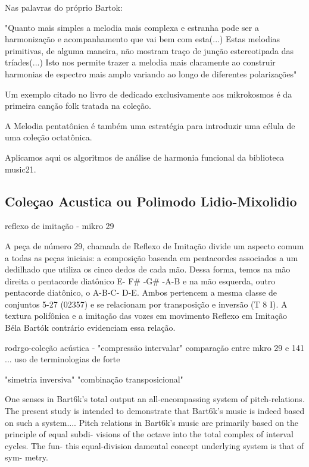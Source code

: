 \documentclass[
	12pt,				%
	openright,			%
	twoside,			%
	a4paper,			%
	english,			%
	french,				%
	spanish,			%
	brazil				%
	]{abntex2}
\begin{document}
Nas palavras do próprio Bartok:

\begin{citacao}
"Quanto mais simples a melodia mais complexa e estranha pode ser a harmonização e acompanhamento que vai bem com esta(...) Estas melodias primitivas, de alguma maneira, não mostram traço de junção estereotipada das tríades(...) Isto nos permite trazer a melodia mais claramente ao construir harmonias de espectro mais amplo variando ao longo de diferentes polarizações"
\cite[p. 342]{bartok1993bela}
\end{citacao}


Um exemplo citado no livro de   dedicado exclusivamente aos mikrokosmos é da primeira canção folk tratada na coleção.

A Melodia pentatônica é também uma estratégia para introduzir uma célula de uma coleção octatônica.

Aplicamos aqui os algoritmos de análise de harmonia funcional da biblioteca music21.




\subsection{Coleçao Acustica ou Polimodo Lidio-Mixolidio}

reflexo de imitação - mikro 29

A peça de número 29, chamada de Reflexo de Imitação divide um aspecto
comum a todas as peças iniciais: a composição baseada em pentacordes associados a um
dedilhado que utiliza os cinco dedos de cada mão. Dessa forma, temos na mão direita o
pentacorde diatônico E- F\# -G\# -A-B e na mão esquerda, outro pentacorde diatônico, o A-B-C-
D-E. Ambos pertencem a mesma classe de conjuntos 5-27 (02357) e se relacionam por
transposição e inversão (T 8 I). A textura
polifônica
e a imitação das vozes em movimento
Reflexo
em Imitação
Béla Bartók
contrário evidenciam essa relação.

rodrgo-coleção acústica - "compressão intervalar"
comparação entre mkro 29 e 141 ... uso de terminologias de forte
\cite[p. 126]{tymoczko2011geometry}


"simetria inversiva"
"combinação transposicional"
\cite{cohn1988inversional}

One senses in Bart6k's total output an all-encompassing
system of
pitch-relations. The present study is intended to demonstrate that
Bart6k's music is indeed based on such a system.... Pitch relations
in Bart6k's music are primarily
based on the principle of equal subdi-
visions of the octave into the total complex of interval cycles. The fun-
this equal-division
damental concept underlying
system is that of sym-
metry.
\end{document}
